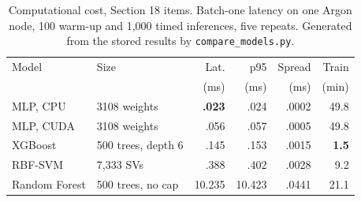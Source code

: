 \begin{table}[t]
\centering
\caption{Computational cost, Section 18 items. Batch-one latency on one Argon node, 100 warm-up and 1,000 timed inferences, five repeats. Generated from the stored results by \texttt{compare\_models.py}.}
\label{tab:cost}
\footnotesize
\setlength{\tabcolsep}{2.5pt}
\begin{tabular}{@{}llrrrr@{}}
\toprule
Model & Size & Lat. & p95 & Spread & Train \\
 & & (ms) & (ms) & (ms) & (min) \\
\midrule
MLP, CPU & 3108 weights & \textbf{.023} & .024 & .0002 & 49.8 \\
MLP, CUDA & 3108 weights & .056 & .057 & .0005 & 49.8 \\
XGBoost & 500 trees, depth 6 & .145 & .153 & .0015 & \textbf{1.5} \\
RBF-SVM & 7,333 SVs & .388 & .402 & .0028 & 9.2 \\
Random Forest & 500 trees, no cap & 10.235 & 10.423 & .0441 & 21.1 \\
\bottomrule
\end{tabular}
\end{table}
